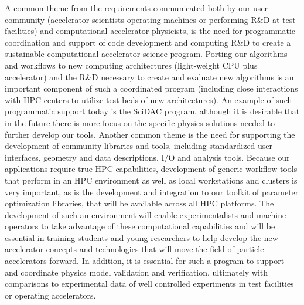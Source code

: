 A common theme from the requirements communicated both by our
user community (accelerator scientists operating machines or
performing R\&D at test facilities) and computational accelerator
physicists, is the need for programmatic coordination and support
of code development and computing R\&D to create a sustainable
computational accelerator science program.  Porting our
algorithms and workflows to new computing architectures
(light-weight CPU plus accelerator) and the R\&D necessary to
create and evaluate new algorithms is an important component of
such a coordinated program (including close interactions with HPC
centers to utilize test-beds of new architectures). An example of
such programmatic support today is the SciDAC program, although
it is desirable that in the future there is more focus on the
specific physics solutions needed to further develop our tools.  Another
common theme is the need for supporting the development of
community libraries and tools, including standardized user
interfaces, geometry and data descriptions, I/O and analysis tools.
Because our applications require true HPC capabilities,
development of generic workflow tools that perform in an HPC
environment as well as local workstations and clusters is very important, as is the development and
integration to our toolkit of parameter optimization libraries,
that will be available across all HPC platforms.  The development
of such an environment will enable experimentalists and machine
operators to take advantage of these computational capabilities
and will be essential in training students and young researchers
to help develop the new accelerator concepts and technologies
that will move the field of particle accelerators forward.   In
addition, it is essential for such a program to support and
coordinate physics model validation and verification, ultimately
with comparisons to experimental data of well controlled
experiments in test facilities or operating accelerators.


